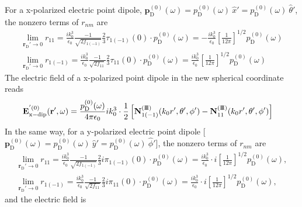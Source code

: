 \documentclass[journal=jacsat,manuscript=article,layout=traditional]{achemso}
\newcommand{\joinR}{\hspace{-.17em}}
\newcommand{\RomanI}{\scriptsize\textrm{I}}
\newcommand{\RomanIII}{\mbox{\RomanI\joinR\RomanI\joinR\RomanI}}
\begin{document}
For a x-polarized electric point dipole, $\mathbf{p}_\mathrm{D}^{(0)}(\omega)=p_\mathrm{D}^{(0)}(\omega)~\hat{x}'=p_\mathrm{D}^{(0)}(\omega)~\hat{\theta}'$, the nonzero terms of $r_{nm}$ are
\begin{subequations}
    \begin{align}
        \lim_{\mathbf{r}_\mathrm{D}'\rightarrow0}r_{11}=
        \frac{ik_0^3}{\epsilon_0}\frac{-1}{\sqrt{2f_{1(-1)}}}\frac{2}{3}\tau_{1(-1)}(0)\cdot p_\mathrm{D}^{(0)}(\omega)=-
        \frac{ik_0^3}{\epsilon_0}\left[\frac{1}{12\pi}\right]^{1/2} p_\mathrm{D}^{(0)}(\omega)\\
        \lim_{\mathbf{r}_\mathrm{D}'\rightarrow0}r_{1(-1)}=
        \frac{ik_0^3}{\epsilon_0}\frac{-1}{\sqrt{2f_{11}}}\frac{2}{3}\tau_{11}(0)\cdot p_\mathrm{D}^{(0)}(\omega)=
        \frac{ik_0^3}{\epsilon_0}\left[\frac{1}{12\pi}\right]^{1/2} p_\mathrm{D}^{(0)}(\omega)
    \end{align}    
\end{subequations}
The electric field of a x-polarized point dipole in the new spherical coordinate reads
\begin{align}
    \mathbf{E}_\mathrm{x-dip}^{'(0)}(\mathbf{r}',\omega)
    &=\frac{p_\mathrm{D}^{(0)}(\omega)}{4\pi\epsilon_0}ik_0^3
    \cdot\frac{1}{2}\left[
    \mathbf{N}_{\mathstrut{1(-1)}}^{(\RomanIII)}(k_0r',\theta',\phi')-
    \mathbf{N}_{\mathstrut{11}}^{(\RomanIII)}(k_0r',\theta',\phi')
    \right]
    \label{Eq:xdipoleimp}
\end{align}
In the same way, for a y-polarized electric point dipole [$\mathbf{p}_\mathrm{D}^{(0)}(\omega)=p_\mathrm{D}^{(0)}(\omega)~\hat{y}'=p_\mathrm{D}^{(0)}(\omega)~\hat{\phi}'$], the nonzero terms of $r_{nm}$ are
\begin{subequations}
    \begin{align}
        \lim_{\mathbf{r}_\mathrm{D}'\rightarrow0}r_{11}=
        \frac{ik_0^3}{\epsilon_0}\frac{-1}{\sqrt{2f_{1(-1)}}}\frac{2}{3}i\pi_{1(-1)}(0)\cdot p_\mathrm{D}^{(0)}(\omega)=
        \frac{ik_0^3}{\epsilon_0}\cdot i\left[\frac{1}{12\pi}\right]^{1/2} p_\mathrm{D}^{(0)}(\omega),\\
        \lim_{\mathbf{r}_\mathrm{D}'\rightarrow0}r_{1(-1)}=
        \frac{ik_0^3}{\epsilon_0}\frac{-1}{\sqrt{2f_{11}}}\frac{2}{3}i\pi_{11}(0)\cdot p_\mathrm{D}^{(0)}(\omega)=
        \frac{ik_0^3}{\epsilon_0}\cdot i\left[\frac{1}{12\pi}\right]^{1/2} p_\mathrm{D}^{(0)}(\omega),
    \end{align}    
\end{subequations}
and the electric field is
\end{document}
